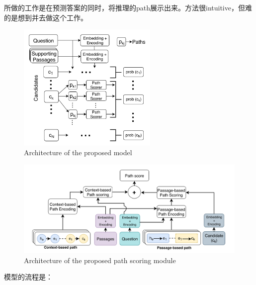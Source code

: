 \documentclass[a4paper,UTF8]{article}
\numberwithin{equation}{section}
\begin{document}
所做的工作是在预测答案的同时，将推理的path展示出来。方法很intuitive，但难的是想到并去做这个工作。
\begin{figure}[H]
	\centering
	\includegraphics[width=0.6\textwidth]{2-1.png}
	\caption{Architecture of the proposed model}
\end{figure}
\begin{figure}[H]
	\centering
	\includegraphics[width=\textwidth]{2-2.png}
	\caption{Architecture of the proposed path scoring module}
\end{figure}
\newpage
模型的流程是：
\end{document}
